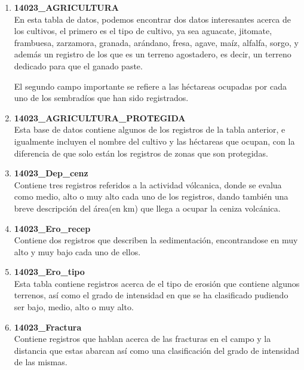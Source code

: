 \documentclass[10pt,letterpaper]{article}
\begin{document}
\begin{enumerate}
\item \textbf{14023\_AGRICULTURA}\\

En esta tabla de datos, podemos encontrar dos datos interesantes acerca de los cultivos, el primero es el tipo de cultivo, ya sea aguacate, jitomate, frambuesa, zarzamora, granada, ar\'andano, fresa, agave, ma\'iz, alfalfa, sorgo, y adem\'as un registro de los que es un terreno agostadero, es decir, un terreno dedicado para que el ganado paste.

El segundo campo importante se refiere a las h\'ectareas ocupadas por cada uno de los sembrad\'ios que han sido registrados.

\item \textbf{14023\_AGRICULTURA\_PROTEGIDA}\\

Esta base de datos contiene algunos de los registros de la tabla anterior, e igualmente incluyen el nombre del cultivo y las h\'ectareas que ocupan, con la diferencia de que solo est\'an los registros de zonas que son protegidas.

\item \textbf{14023\_Dep\_cenz}\\

Contiene tres registros referidos a la actividad v\'olcanica, donde se evalua como medio, alto o muy alto cada uno de los registros, dando tambi\'en una breve descripci\'on del \'area(en km) que llega a ocupar la ceniza volc\'anica.

\item \textbf{14023\_Ero\_recep}\\

Contiene dos registros que describen la sedimentaci\'on, encontrandose en muy alto y muy bajo cada uno de ellos.

\item \textbf{14023\_Ero\_tipo}\\

Esta tabla contiene registros acerca de el tipo de erosi\'on que contiene algunos terrenos, as\'i como el grado de intensidad en que se ha clasificado pudiendo ser bajo, medio, alto o muy alto.

\item \textbf{14023\_Fractura}\\

Contiene registros que hablan acerca de las fracturas en el campo y la distancia que estas abarcan as\'i como una clasificaci\'on del grado de intensidad de las mismas.


\end{enumerate}
\end{document}
